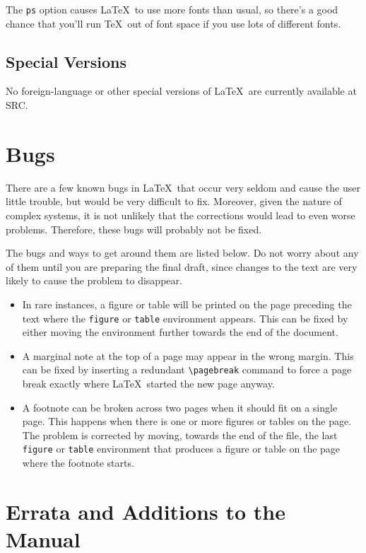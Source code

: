 The {\tt ps} option causes \LaTeX\ to use more fonts than usual,
so there's a good chance that you'll run \TeX\ out of font
space if you use lots of different fonts.
  
\subsection{Special Versions}
 
No foreign-language or other special versions of \LaTeX\
are currently available at SRC.
 
 
\section{Bugs}
 
There are a few known bugs in \LaTeX\ that occur very seldom and
cause the user little trouble, but would be very difficult to fix.
Moreover, given the nature of complex systems, it is not unlikely that
the corrections would lead to even worse problems.  Therefore, these
bugs will probably not be fixed.  
 
The bugs and ways to get around them are listed below.  Do not worry
about any of them until you are preparing the final draft, since
changes to the text are very likely to cause the problem to disappear.
\begin{itemize}
\item In rare instances, a figure or table will be printed on the page
preceding the text where the {\tt figure} or {\tt table} environment
appears.  This can be fixed by either moving the environment further
towards the end of the document. 
 
\item A marginal note at the top of a page may appear in the wrong
margin.  This can be fixed by inserting a redundant \verb|\pagebreak|
command to force a page break exactly where \LaTeX\ started the new
page anyway.
 
\item A footnote can be broken across two pages when it should fit on a
single page.  This happens when there is one or more figures or tables
on the page.  The problem is corrected by moving, towards the end of the
file, the last {\tt figure} or {\tt table} environment that produces a
figure or table on the page where the footnote starts.
\end{itemize}
 
 
\section{Errata and Additions to the Manual}
 


 
 
